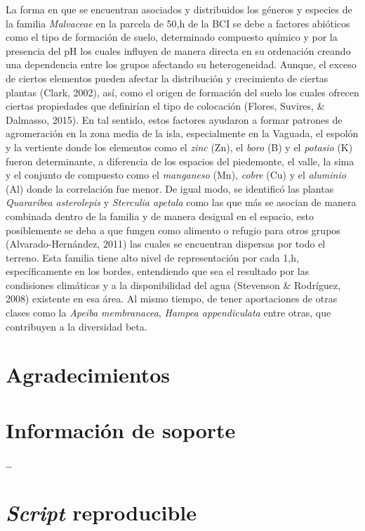 \documentclass[11pt,]{article}
\begin{document}
La forma en que se encuentran asociados y distribuidos los géneros y
especies de la familia \emph{Malvaceae} en la parcela de 50,h de la BCI
se debe a factores abióticos como el tipo de formación de suelo,
determinado compuesto químico y por la presencia del pH los cuales
influyen de manera directa en su ordenación creando una dependencia
entre los grupos afectando su heterogeneidad. Aunque, el exceso de
ciertos elementos pueden afectar la distribución y crecimiento de
ciertas plantas (Clark, 2002), así, como el origen de formación del
suelo los cuales ofrecen ciertas propiedades que definirían el tipo de
colocación (Flores, Suvires, \& Dalmasso, 2015). En tal sentido, estos
factores ayudaron a formar patrones de agromeración en la zona media de
la isla, especialmente en la Vaguada, el espolón y la vertiente donde
los elementos como el \emph{zinc} (Zn), el \emph{boro} (B) y el
\emph{potasio} (K) fueron determinante, a diferencia de los espacios del
piedemonte, el valle, la sima y el conjunto de compuesto como el
\emph{manganeso} (Mn), \emph{cobre} (Cu) y el \emph{aluminio} (Al) donde
la correlación fue menor. De igual modo, se identificó las plantas
\emph{Quararibea asterolepis} y \emph{Sterculia apetala} como las que
más se asocian de manera combinada dentro de la familia y de manera
desigual en el espacio, esto posiblemente se deba a que fungen como
alimento o refugio para otros grupos (Alvarado-Hernández, 2011) las
cuales se encuentran dispersas por todo el terreno. Esta familia tiene
alto nivel de representación por cada 1,h, específicamente en los
bordes, entendiendo que sea el resultado por las condisiones climáticas
y a la disponibilidad del agua (Stevenson \& Rodríguez, 2008) existente
en esa área. Al mismo tiempo, de tener aportaciones de otras clases como
la \emph{Apeiba membranacea}, \emph{Hampea appendiculata} entre otras,
que contribuyen a la diversidad beta.

\section{Agradecimientos}\label{agradecimientos}

\section{Información de soporte}\label{informaciuxf3n-de-soporte}

\ldots

\section{\texorpdfstring{\emph{Script}
reproducible}{Script reproducible}}\label{script-reproducible}
\end{document}
